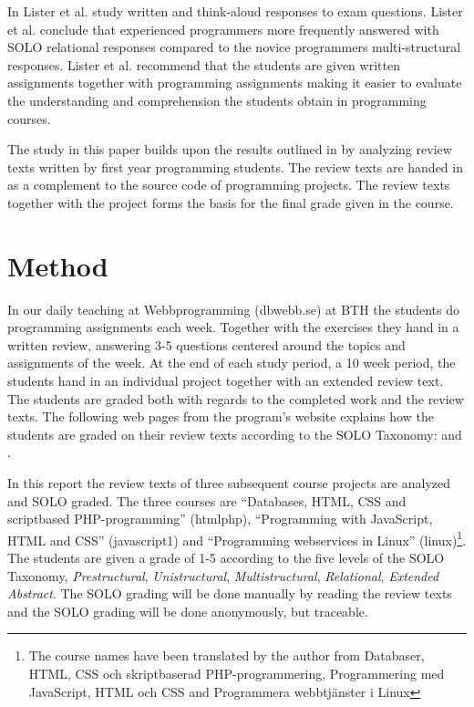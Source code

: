 \documentclass[twoside,twocolumn,a4paper,11pt,english]{article}
\begin{document}
In \cite{lister2006not} Lister et al. study written and think-aloud responses to exam questions. Lister et al. conclude that experienced programmers more frequently answered with SOLO relational responses compared to the novice programmers multi-structural responses. Lister et al. recommend that the students are given written assignments together with programming assignments making it easier to evaluate the understanding and comprehension the students obtain in programming courses.

The study in this paper builds upon the results outlined in \cite{lister2006not} by analyzing review texts written by first year programming students. The review texts are handed in as a complement to the source code of programming projects. The review texts together with the project forms the basis for the final grade given in the course.




\section{Method}

In our daily teaching at Webbprogramming (dbwebb.se) at BTH the students do programming assignments each week. Together with the exercises they hand in a written review, answering 3-5 questions centered around the topics and assignments of the week. At the end of each study period, a 10 week period, the students hand in an individual project together with an extended review text. The students are graded both with regards to the completed work and the review texts. The following web pages from the program's website explains how the students are graded on their review texts according to the SOLO Taxonomy: \cite{redovisning} and \cite{solo}.


In this report the review texts of three subsequent course projects are analyzed and SOLO graded. The three courses are ``Databases, HTML, CSS and scriptbased PHP-programming'' (htmlphp), ``Programming with JavaScript, HTML and CSS'' (javascript1) and ``Programming webservices in Linux'' (linux)\footnote{The course names have been translated by the author from Databaser, HTML, CSS och skriptbaserad PHP-programmering, Programmering med JavaScript, HTML och CSS and Programmera webbtjänster i Linux}. The students are given a grade of 1-5 according to the five levels of the SOLO Taxonomy, \textit{Prestructural}, \textit{Unistructural}, \textit{Multistructural}, \textit{Relational}, \textit{Extended Abstract}. The SOLO grading will be done manually by reading the review texts and the SOLO grading will be done anonymously, but traceable.
\end{document}
